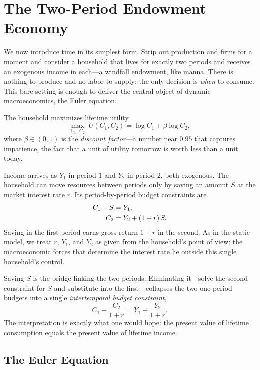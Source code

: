 \section{The Two-Period Endowment Economy}

We now introduce time in its simplest form. Strip out production and firms for a moment and consider a household that lives for exactly two periods and receives an exogenous income in each---a windfall endowment, like manna. There is nothing to produce and no labor to supply; the only decision is \emph{when} to consume. This bare setting is enough to deliver the central object of dynamic macroeconomics, the Euler equation.

The household maximizes lifetime utility
\[
\max_{C_1,\,C_2}\; U(C_1, C_2) = \log C_1 + \beta \log C_2,
\]
where $\beta \in (0,1)$ is the \emph{discount factor}---a number near $0.95$ that captures impatience, the fact that a unit of utility tomorrow is worth less than a unit today.


Income arrives as $Y_1$ in period $1$ and $Y_2$ in period $2$, both exogenous. The household can move resources between periods only by saving an amount $S$ at the market interest rate $r$. Its period-by-period budget constraints are
\[
\begin{aligned}
C_1 + S &= Y_1, \\
C_2 &= Y_2 + (1+r)\,S.
\end{aligned}
\]
Saving in the first period earns gross return $1+r$ in the second. As in the static model, we treat $r$, $Y_1$, and $Y_2$ as given from the household's point of view: the macroeconomic forces that determine the interest rate lie outside this single household's control.

Saving $S$ is the bridge linking the two periods. Eliminating it---solve the second constraint for $S$ and substitute into the first---collapses the two one-period budgets into a single \emph{intertemporal budget constraint},
\[
C_1 + \frac{C_2}{1+r} = Y_1 + \frac{Y_2}{1+r}.
\]
The interpretation is exactly what one would hope: the present value of lifetime consumption equals the present value of lifetime income.

\subsection{The Euler Equation}

